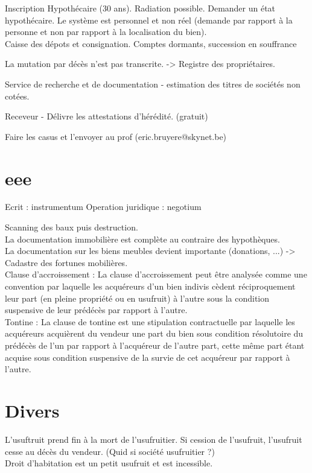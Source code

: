 \documentclass{book}
\begin{document}
Inscription Hypothécaire (30 ans). Radiation possible. Demander un état hypothécaire. Le système est personnel et non réel (demande par rapport à la personne et non par rapport à la localisation du bien).\\

Caisse des dépots et consignation. Comptes dormants, succession en souffrance 

La mutation par décès n'est pas transcrite. -> Registre des propriétaires.

Service de recherche et de documentation - estimation des titres de sociétés non cotées.

Receveur - Délivre les attestations d'hérédité. (gratuit)

Faire les casus et l'envoyer au prof (eric.bruyere@skynet.be)

\chapter{eee}

Ecrit : instrumentum 
Operation juridique : negotium

Scanning des baux puis destruction.\\

La documentation immobilière est complète au contraire des hypothèques.\\

La documentation sur les biens meubles devient importante (donations, ...) -> Cadastre des fortunes mobilières.\\

Clause d'accroissement : La clause d’accroissement peut être analysée comme une convention par laquelle les acquéreurs d’un bien indivis cèdent réciproquement leur part (en pleine propriété ou en usufruit) à l’autre sous la condition suspensive de leur prédécès par rapport à l’autre.\\

Tontine : La clause de tontine est une stipulation contractuelle par laquelle les acquéreurs acquièrent du vendeur une part du bien sous condition résolutoire du prédécès de l’un par rapport à l’acquéreur de l’autre part, cette même part étant acquise sous condition suspensive de la survie de cet acquéreur par rapport à l’autre. \\

\chapter{Divers}
L'usuftruit prend fin à la mort de l'usufruitier. Si cession de l'usufruit, l'usufruit cesse au décès du vendeur. (Quid si société usufruitier ?)\\
Droit d'habitation est un petit usufruit et est incessible.\\
\end{document}
